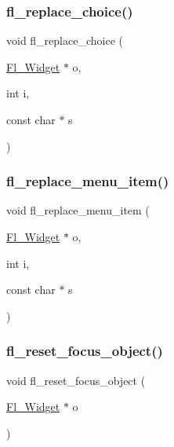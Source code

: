 \subsubsection{\texorpdfstring{fl\+\_\+replace\+\_\+choice()}{fl\_replace\_choice()}}
{\footnotesize\ttfamily void fl\+\_\+replace\+\_\+choice (\begin{DoxyParamCaption}\item[{\hyperlink{class_fl___widget}{Fl\+\_\+\+Widget} $\ast$}]{o,  }\item[{int}]{i,  }\item[{const char $\ast$}]{s }\end{DoxyParamCaption})\hspace{0.3cm}{\ttfamily [inline]}}

\mbox{\label{forms_8_h_ad1569481e54ca50fea923df8edb2ca70}} 
\subsubsection{\texorpdfstring{fl\+\_\+replace\+\_\+menu\+\_\+item()}{fl\_replace\_menu\_item()}}
{\footnotesize\ttfamily void fl\+\_\+replace\+\_\+menu\+\_\+item (\begin{DoxyParamCaption}\item[{\hyperlink{class_fl___widget}{Fl\+\_\+\+Widget} $\ast$}]{o,  }\item[{int}]{i,  }\item[{const char $\ast$}]{s }\end{DoxyParamCaption})\hspace{0.3cm}{\ttfamily [inline]}}

\mbox{\label{forms_8_h_ae1c4499ba3f67fba6a9f26e7b073bac0}} 
\subsubsection{\texorpdfstring{fl\+\_\+reset\+\_\+focus\+\_\+object()}{fl\_reset\_focus\_object()}}
{\footnotesize\ttfamily void fl\+\_\+reset\+\_\+focus\+\_\+object (\begin{DoxyParamCaption}\item[{\hyperlink{class_fl___widget}{Fl\+\_\+\+Widget} $\ast$}]{o }\end{DoxyParamCaption})\hspace{0.3cm}{\ttfamily [inline]}}

